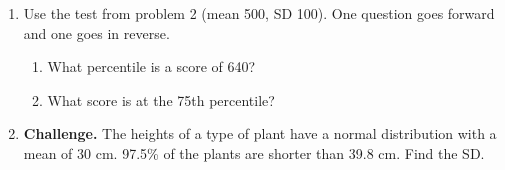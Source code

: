 \documentclass[11pt]{article}
\begin{document}
\begin{enumerate}
\work{5em}

\newpage
\item Use the test from problem 2 (mean 500, SD 100). One question goes forward and one goes in reverse.
\begin{enumerate}[itemsep=1em]
  \item What percentile is a score of 640?

  \work{4em}
  \item What score is at the 75th percentile?

\end{enumerate}
\work{4em}

\item \textbf{Challenge.} The heights of a type of plant have a normal distribution with a mean of 30 cm. 97.5\% of the plants are shorter than 39.8 cm. Find the SD.


\end{enumerate}
\end{document}
